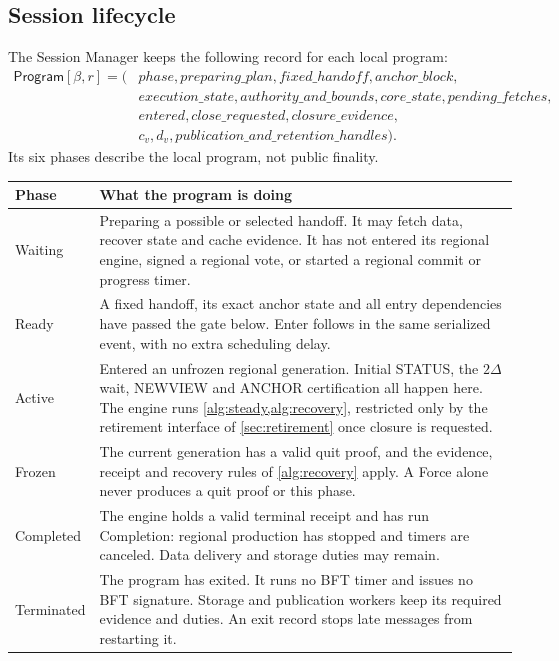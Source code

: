 \documentclass[11pt,a4paper]{article}
\newcommand{\tagg}[1]{\ensuremath{\mathsf{#1}}}
\begin{document}
\subsection{Session lifecycle}
\label{sec:session-lifecycle}
The Session Manager keeps the following record for each local program:
\[
\begin{aligned}
\tagg{Program}[\beta,r]=(&\mathit{phase},\mathit{preparing\_plan},
 \mathit{fixed\_handoff},\mathit{anchor\_block},\\
 &\mathit{execution\_state},\mathit{authority\_and\_bounds},
 \mathit{core\_state},\mathit{pending\_fetches},\\
 &\mathit{entered},\mathit{close\_requested},\mathit{closure\_evidence},\\
 &c_v,d_v,\mathit{publication\_and\_retention\_handles}).
\end{aligned}
\]
Its six phases describe the local program, not public finality.
\begin{center}\small
\begin{tabularx}{\linewidth}{@{}>{\raggedright\arraybackslash}p{.15\linewidth}Y@{}}\toprule
Phase & What the program is doing\\\midrule
Waiting & Preparing a possible or selected handoff. It may fetch data,
recover state and cache evidence. It has not entered its regional
engine, signed a regional vote, or started a regional commit or progress
timer.\\
Ready & A fixed handoff, its exact anchor state and all entry
dependencies have passed the gate below. Enter follows in the same
serialized event, with no extra scheduling delay.\\
Active & Entered an unfrozen regional generation. Initial STATUS, the
$2\Delta$ wait, NEWVIEW and ANCHOR certification all happen here. The
engine runs \cref{alg:steady,alg:recovery}, restricted only by the
retirement interface of \cref{sec:retirement} once closure is requested.\\
Frozen & The current generation has a valid quit proof, and the evidence,
receipt and recovery rules of \cref{alg:recovery} apply. A Force alone
never produces a quit proof or this phase.\\
Completed & The engine holds a valid terminal receipt and has run
Completion: regional production has stopped and timers are canceled.
Data delivery and storage duties may remain.\\
Terminated & The program has exited. It runs no BFT timer and issues no
BFT signature. Storage and publication workers keep its required evidence
and duties. An exit record stops late messages from restarting it.\\\bottomrule
\end{tabularx}
\end{center}
\end{document}
